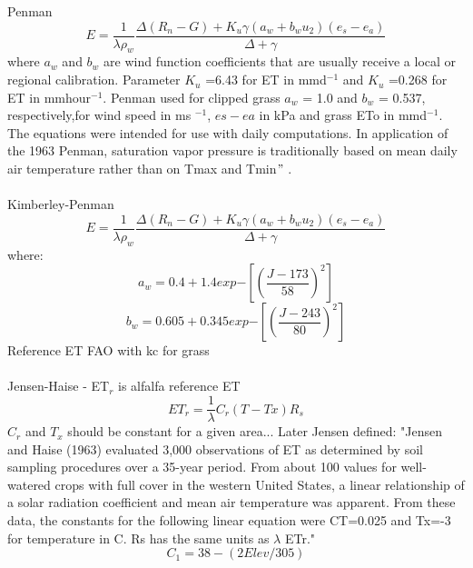 \documentclass[hydrology,article,submit,moreauthors,pdftex]{Definitions/mdpi}
\begin{document}
Penman \\
\begin{equation}
E = \frac{1}{\lambda \rho_w} \frac{\Delta (R_{n}-G) + K_u \gamma(a_w+b_wu_2)(e_{s}-e_{a})}{\Delta +\gamma}
\end{equation}
where $a_w$ and $b_w$ are wind function coefficients that are usually receive a local or regional calibration.
Parameter $K_u$ =6.43 for ET in mmd$^{-1}$ and $K_u$ =0.268 for ET in mmhour$^{-1}$.
Penman \cite{penman1963vegetation} used for clipped grass \cite{asce2005asce} $a_w$ = 1.0 and $b_w$ = 0.537, respectively,for wind speed in ms $^{-1}$, $es-ea$ in kPa and grass ETo in mmd$^{-1}$. The equations were intended for use with daily computations. In application of the 1963 Penman, saturation vapor pressure is traditionally based on mean daily air temperature rather than on Tmax and Tmin$"$ \cite{jensen1990evapotranspiration}. \\
\\
Kimberley-Penman \cite{asce2005asce}
\begin{equation}
E = \frac{1}{\lambda \rho_w} \frac{\Delta (R_{n}-G) + K_u \gamma(a_w+b_wu_2)(e_{s}-e_{a})}{\Delta +\gamma} 
\end{equation}
where:
\begin{equation}
a_w = 0.4 + 1.4 exp{-\left[\left(\frac{J-173}{58}\right)^2\right]}
\end{equation}
\begin{equation}
b_w = 0.605 + 0.345 exp{-\left[\left(\frac{J-243}{80}\right)^2\right]}
\end{equation}
Reference ET FAO with kc for grass\\
\\
Jensen-Haise \cite{asce2005asce} - ET$_r$ is alfalfa reference ET
\begin{equation}
ET_r = \frac{1}{\lambda} C_r(T-Tx)R_s
\end{equation}
$C_r$ and $T_x$ should be constant for a given area...
Later Jensen defined:
"Jensen and Haise (1963) evaluated 3,000 observations of ET as determined by soil sampling procedures over a 35-year period. From about 100 values for well-watered crops with full cover in the western United States, a linear relationship of a solar radiation coefficient and mean air temperature was apparent. From these data, the constants for the following linear equation were CT=0.025 and Tx=-3 for temperature in C. Rs has the same units as $\lambda$ ETr."
\begin{equation}
C_1 = 38-(2Elev/305)
\end{equation}
\end{document}

